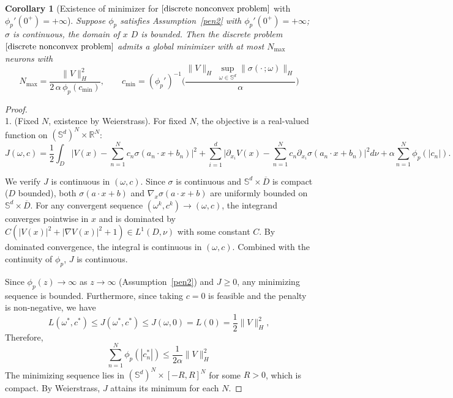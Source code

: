 \documentclass[12pt,fleqn]{amsart}
\newtheorem{corollary}{Corollary}[theorem]
\theoremstyle{definition}
\begin{document}
\begin{corollary}[Existence of minimizer for $\eqref{discrete nonconvex problem}$ with $\phi_p'(0^+) = +\infty$]
\label{cor:discrete_existence}
Suppose $\phi_p$ satisfies Assumption~\ref{pen2} with $\phi_p'(0^+) = +\infty$;
$\sigma$ is continuous, the domain of $x$ $D$ is bounded. 
Then the discrete problem $\eqref{discrete nonconvex problem}$ admits a global minimizer with at most $N_{\max}$ neurons with
\[
	N_{\max} = \frac{\|V\|_H^2}{2\,\alpha\,\phi_p(c_{\min})}, \qquad
	c_{\min} = (\phi_p')^{-1}\!\bigg(\frac{\|V\|_H\;\sup_{\omega \in \mathbb{S}^d}\|\sigma(\cdot\,;\omega)\|_H}{\alpha}\bigg)
\]
\end{corollary}
\begin{proof}\quad\\
1. (Fixed $N$, existence by Weierstrass).
For fixed $N$, the objective is a real-valued function on $(\mathbb{S}^d)^N \times \mathbb{R}^N$:
\[
	J(\omega, c) = \frac{1}{2} \int_D \bigg| V(x) - \sum_{n=1}^N c_n \sigma(a_n \cdot x + b_n) \bigg|^2 + \sum_{i=1}^d \bigg| \partial_{x_i} V(x) - \sum_{n=1}^N c_n \partial_{x_i} \sigma(a_n \cdot x + b_n) \bigg|^2 d\nu + \alpha \sum_{n=1}^N \phi_p(|c_n|).
\]

We verify $J$ is continuous in $(\omega, c)$.
Since $\sigma$ is continuous and $\mathbb{S}^d \times \overline{D}$ is compact ($D$ bounded), both $\sigma(a \cdot x + b)$ and $\nabla_x \sigma(a \cdot x + b)$ are uniformly bounded on $\mathbb{S}^d \times \overline{D}$.
For any convergent sequence $(\omega^k, c^k) \to (\omega, c)$, the integrand converges pointwise in $x$ and is dominated by $C(|V(x)|^2 + |\nabla V(x)|^2 + 1) \in L^1(D, \nu)$ with some constant $C$.
By dominated convergence, the integral is continuous in $(\omega, c)$. Combined with the continuity of $\phi_p$, $J$ is continuous.

Since $\phi_p(z) \to \infty$ as $z \to \infty$ (Assumption~\ref{pen2}) and $J \ge 0$, any minimizing sequence is bounded.
Furthermore, since taking $c = 0$ is feasible and the penalty is non-negative, we have
\begin{equation*}
	L(\omega^*, c^*) \le J(\omega^*, c^*) \le J(\omega, 0) = L(0) = \frac{1}{2}\|V\|_H^2,
\end{equation*}
Therefore,
\begin{equation*}
	\sum_{n = 1}^N \phi_p(|c_n^*|) \le \frac{1}{2\alpha}\|V\|_H^2
\end{equation*} 
The minimizing sequence lies in $(\mathbb{S}^d)^N \times [-R, R]^N$ for some $R > 0$, which is compact. By Weierstrass, $J$ attains its minimum for each $N$.


\end{proof}
\end{document}
